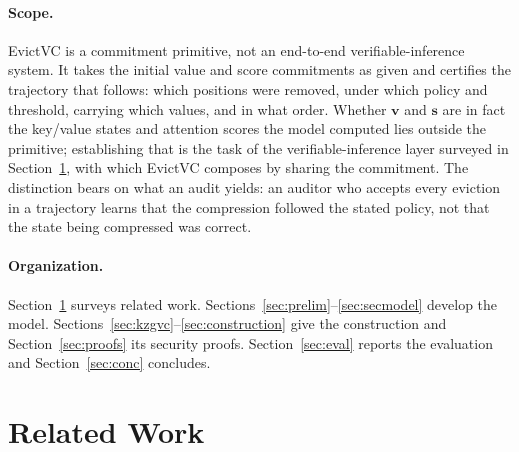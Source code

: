 \documentclass[version=preprint]{iacrcc}
\theoremstyle{definition}
\begin{document}
\paragraph{Scope.}
EvictVC is a commitment primitive, not an end-to-end verifiable-inference
system. It takes the initial value and score commitments as given and certifies
the trajectory that follows: which positions were removed, under which policy
and threshold, carrying which values, and in what order. Whether $\mathbf{v}$
and $\mathbf{s}$ are in fact the key/value states and attention scores the model
computed lies outside the primitive; establishing that is the task of the
verifiable-inference layer surveyed in Section~\ref{sec:related}, with which
EvictVC composes by sharing the commitment. The distinction bears on what an
audit yields: an auditor who accepts every eviction in a trajectory learns that
the compression followed the stated policy, not that the state being compressed
was correct.

\paragraph{Organization.}
Section~\ref{sec:related} surveys related work. Sections~\ref{sec:prelim}--\ref{sec:secmodel}
develop the model. Sections~\ref{sec:kzgvc}--\ref{sec:construction} give the
construction and Section~\ref{sec:proofs} its security proofs.
Section~\ref{sec:eval} reports the evaluation and Section~\ref{sec:conc}
concludes.

\section{Related Work}\label{sec:related}
\end{document}
